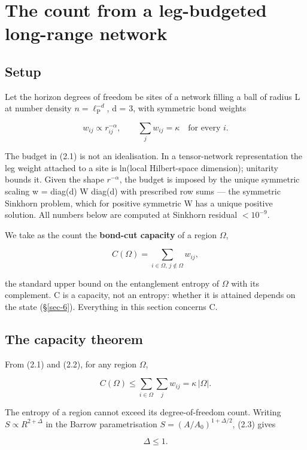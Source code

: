 \documentclass[12pt]{iopart}
\begin{document}
\section{The count from a leg-budgeted long-range network}\label{sec-2}

\subsection{Setup}\label{sec-2-1}

Let the horizon degrees of freedom be sites of a network filling a ball
of radius L at number density \(n = \ell _{\mathrm{P}}^{-d}\), d = 3,
with symmetric bond weights

\[w_{ij} \propto r_{ij}^{-\alpha}, \qquad \sum_j w_{ij} = \kappa \quad\text{for every } i. \tag{2.1}\]

The budget in (2.1) is not an idealisation. In a tensor-network
representation the leg weight attached to a site is ln(local
Hilbert-space dimension); unitarity bounds it. Given the shape
\(r^{-\alpha }\), the budget is imposed by the unique symmetric scaling
w = diag(d) W diag(d) with prescribed row sums --- the symmetric
Sinkhorn problem, which for positive symmetric W has a unique positive
solution. All numbers below are computed at Sinkhorn residual
\(< 10^{-9}\).

We take as the count the \textbf{bond-cut capacity} of a region
\(\Omega\),

\[C(\Omega) = \sum_{i\in\Omega,\, j\notin\Omega} w_{ij}, \tag{2.2}\]

the standard upper bound on the entanglement entropy of \(\Omega\) with
its complement. C is a capacity, not an entropy: whether it is attained
depends on the state (§\ref{sec-6}). Everything in this section concerns
C.

\subsection{The capacity theorem}\label{sec-2-2}

From (2.1) and (2.2), for any region \(\Omega\),

\[C(\Omega) \le \sum_{i\in\Omega} \sum_j w_{ij} = \kappa\,|\Omega|. \tag{2.3}\]

The entropy of a region cannot exceed its degree-of-freedom count.
Writing \(S \propto  R^{2+\Delta }\) in the Barrow parametrisation
\(S = (A/A_{0})^{1+\Delta /2}\), (2.3) gives

\[\Delta \le 1. \tag{2.4}\]
\end{document}
